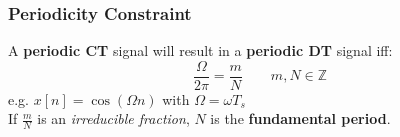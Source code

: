 \subsubsection{Periodicity Constraint}
    A \textbf{periodic CT} signal will result in a \textbf{periodic DT} signal iff:
    $$
        \frac{\Omega}{2\pi} = \frac{m}{N} \qquad m,N \in \mathbb{Z}
    $$
    e.g. $x[n] = \cos(\Omega n)$ with $\Omega = \omega T_s$\\
    If $\frac{m}{N}$ is an \textit{irreducible fraction}, $N$ is the \textbf{fundamental period}.